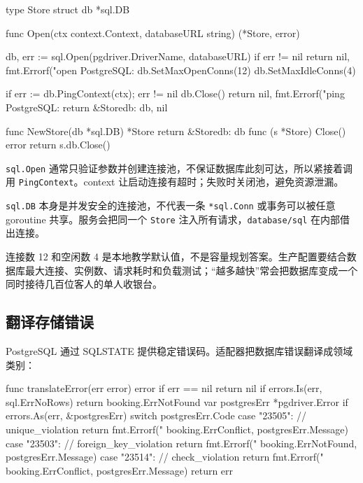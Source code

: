 \begin{gocode}[title={代码清单 12.40 \texttt{store.go}：打开存储并配置连接池}]
type Store struct {
    db *sql.DB
}

func Open(ctx context.Context, databaseURL string) (*Store, error) {
    db, err := sql.Open(pgdriver.DriverName, databaseURL)
    if err != nil {
        return nil, fmt.Errorf("open PostgreSQL: %
    }
    db.SetMaxOpenConns(12)
    db.SetMaxIdleConns(4)

    if err := db.PingContext(ctx); err != nil {
        db.Close()
        return nil, fmt.Errorf("ping PostgreSQL: %
    }
    return &Store{db: db}, nil
}

func NewStore(db *sql.DB) *Store { return &Store{db: db} }
func (s *Store) Close() error    { return s.db.Close() }
\end{gocode}

\texttt{sql.Open} 通常只验证参数并创建连接池，不保证数据库此刻可达，所以紧接着调用 \texttt{PingContext}。context 让启动连接有超时；失败时关闭池，避免资源泄漏。

\texttt{sql.DB} 本身是并发安全的连接池，不代表一条 \texttt{*sql.Conn} 或事务可以被任意 goroutine 共享。服务会把同一个 \texttt{Store} 注入所有请求，\texttt{database/sql} 在内部借出连接。

连接数 12 和空闲数 4 是本地教学默认值，不是容量规划答案。生产配置要结合数据库最大连接、实例数、请求耗时和负载测试；“越多越快”常会把数据库变成一个同时接待几百位客人的单人收银台。

\subsection{翻译存储错误}

PostgreSQL 通过 SQLSTATE 提供稳定错误码。适配器把数据库错误翻译成领域类别：

\begin{gocode}[title={代码清单 12.41 \texttt{store.go}：数据库错误翻译}]
func translateError(err error) error {
    if err == nil {
        return nil
    }
    if errors.Is(err, sql.ErrNoRows) {
        return booking.ErrNotFound
    }
    var postgresErr *pgdriver.Error
    if errors.As(err, &postgresErr) {
        switch postgresErr.Code {
        case "23505": // unique_violation
            return fmt.Errorf("%
                booking.ErrConflict, postgresErr.Message)
        case "23503": // foreign_key_violation
            return fmt.Errorf("%
                booking.ErrNotFound, postgresErr.Message)
        case "23514": // check_violation
            return fmt.Errorf("%
                booking.ErrConflict, postgresErr.Message)
        }
    }
    return err
}
\end{gocode}

